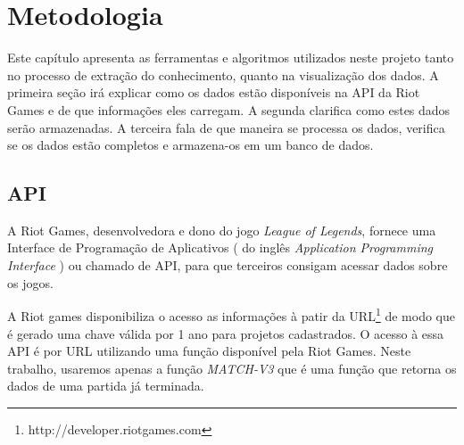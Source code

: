 \chapter{Metodologia}
Este capítulo apresenta as ferramentas e algoritmos utilizados neste projeto tanto no processo de extração do conhecimento, quanto na visualização dos dados.
A primeira seção irá explicar como os dados estão disponíveis na API da Riot Games e de que informações eles carregam. A segunda clarifica como estes dados serão armazenadas.  A terceira fala de que maneira se processa os dados, verifica se os dados estão completos e armazena-os em um banco de dados.

\section{API}
A Riot Games, desenvolvedora e dono do jogo \textit{League of Legends}, fornece uma Interface de Programação de Aplicativos ( do inglês \textit{Application Programming Interface} ) ou chamado de API, para que terceiros consigam acessar dados sobre os jogos.

A Riot games disponibiliza o acesso as informações à patir da URL\footnote{http://developer.riotgames.com} de modo que é gerado uma chave válida por 1 ano para projetos cadastrados.
O acesso à essa API é por URL utilizando uma função disponível pela Riot Games. Neste trabalho, usaremos apenas a função \textit{MATCH-V3} que é uma função que retorna os dados de uma partida já terminada.

